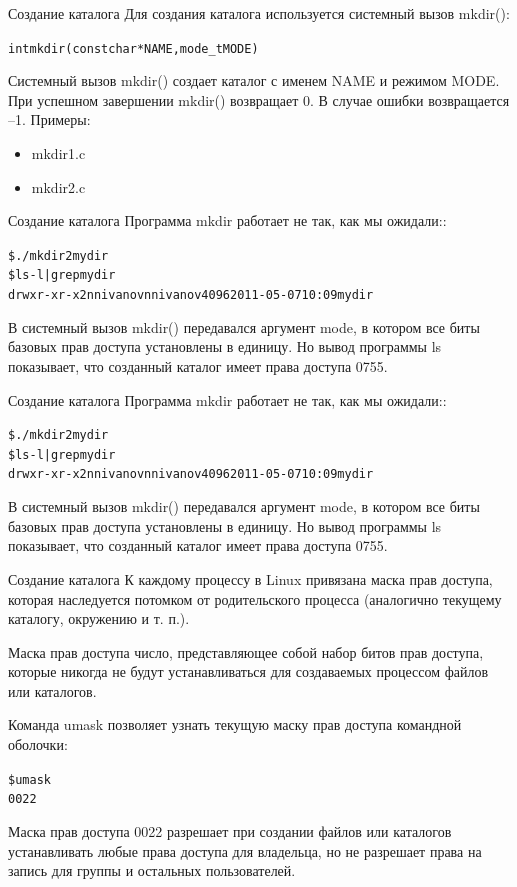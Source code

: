 \documentclass{beamer}
\begin{document}
\begin{frame}[fragile]{Создание каталога}
Для создания каталога используется системный вызов mkdir():
\begin{alltt}
int mkdir (const char * NAME, mode_t MODE)
\end{alltt}
Системный вызов mkdir() создает каталог с именем NAME и режимом MODE. При
успешном завершении mkdir() возвращает 0. В случае ошибки возвращается –1.
Примеры: 
\begin{itemize}
\item mkdir1.c
\item mkdir2.c
\end{itemize}
\end{frame}

\begin{frame}[fragile]{Создание каталога}
Программа mkdir работает не так, как мы ожидали::
\begin{alltt}
\$ ./mkdir2 mydir
\$ ls -l | grep mydir
drwxr-xr-x 2 nnivanov nnivanov 4096 2011-05-07 10:09 mydir
\end{alltt}
В системный вызов mkdir() передавался аргумент mode, в котором все биты базовых прав доступа установлены в единицу. Но вывод программы ls показывает, что созданный каталог имеет права доступа 0755.
\end{frame}

\begin{frame}[fragile]{Создание каталога}
Программа mkdir работает не так, как мы ожидали::
\begin{alltt}
\$ ./mkdir2 mydir
\$ ls -l | grep mydir
drwxr-xr-x 2 nnivanov nnivanov 4096 2011-05-07 10:09 mydir
\end{alltt}
В системный вызов mkdir() передавался аргумент mode, в котором все биты базовых прав доступа установлены в единицу. Но вывод программы ls показывает, что созданный каталог имеет права доступа 0755.
\end{frame}

\begin{frame}[fragile]{Создание каталога}
К каждому процессу в Linux привязана маска прав доступа, которая наследуется потомком от родительского процесса (аналогично текущему каталогу, окружению и т. п.). 
\begin{block}{Маска прав доступа}
число, представляющее собой набор битов прав доступа, которые никогда не будут устанавливаться для создаваемых процессом файлов или каталогов.
\end{block}
Команда umask позволяет узнать текущую маску прав доступа командной оболочки:
\begin{alltt}
\$ umask
0022
\end{alltt}
Маска прав доступа 0022 разрешает при создании файлов или каталогов устанавливать любые права доступа для владельца, но не разрешает права на запись для группы и остальных пользователей.
\end{frame}
\end{document}
